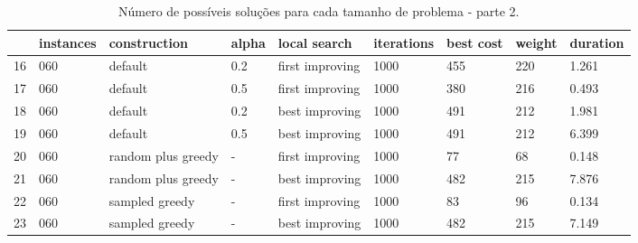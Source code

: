 \begin{landscape}
    \begin{table}
    \centering
    \begin{tabular}{lllllllll}
    \toprule
    {} & instances &        construction & alpha &     local search & iterations & best cost & weight & duration \\
    \midrule
    16 &       060 &             default &   0.2 &  first improving &       1000 &       455 &    220 &    1.261 \\
    17 &       060 &             default &   0.5 &  first improving &       1000 &       380 &    216 &    0.493 \\
    18 &       060 &             default &   0.2 &   best improving &       1000 &       491 &    212 &    1.981 \\
    19 &       060 &             default &   0.5 &   best improving &       1000 &       491 &    212 &    6.399 \\
    20 &       060 &  random plus greedy &     - &  first improving &       1000 &        77 &     68 &    0.148 \\
    21 &       060 &  random plus greedy &     - &   best improving &       1000 &       482 &    215 &    7.876 \\
    22 &       060 &      sampled greedy &     - &  first improving &       1000 &        83 &     96 &    0.134 \\
    23 &       060 &      sampled greedy &     - &   best improving &       1000 &       482 &    215 &    7.149 \\
    \bottomrule
    \end{tabular}
    \caption{Número de possíveis soluções para cada tamanho de problema - parte 2.}
    \label{table:all-data-2}
    \end{table}


\end{landscape}
